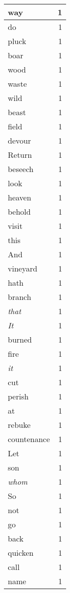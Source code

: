 \begin{center}
\begin{longtable}{l|r}
way & 1 \\ \hline
do & 1 \\ \hline
pluck & 1 \\ \hline
boar & 1 \\ \hline
wood & 1 \\ \hline
waste & 1 \\ \hline
wild & 1 \\ \hline
beast & 1 \\ \hline
field & 1 \\ \hline
devour & 1 \\ \hline
Return & 1 \\ \hline
beseech & 1 \\ \hline
look & 1 \\ \hline
heaven & 1 \\ \hline
behold & 1 \\ \hline
visit & 1 \\ \hline
this & 1 \\ \hline
And & 1 \\ \hline
vineyard & 1 \\ \hline
hath & 1 \\ \hline
branch & 1 \\ \hline
\emph{that} & 1 \\ \hline
\emph{It} & 1 \\ \hline
burned & 1 \\ \hline
fire & 1 \\ \hline
\emph{it} & 1 \\ \hline
cut & 1 \\ \hline
perish & 1 \\ \hline
at & 1 \\ \hline
rebuke & 1 \\ \hline
countenance & 1 \\ \hline
Let & 1 \\ \hline
son & 1 \\ \hline
\emph{whom} & 1 \\ \hline
So & 1 \\ \hline
not & 1 \\ \hline
go & 1 \\ \hline
back & 1 \\ \hline
quicken & 1 \\ \hline
call & 1 \\ \hline
name & 1 \\ \hline
\end{longtable}
\end{center}



